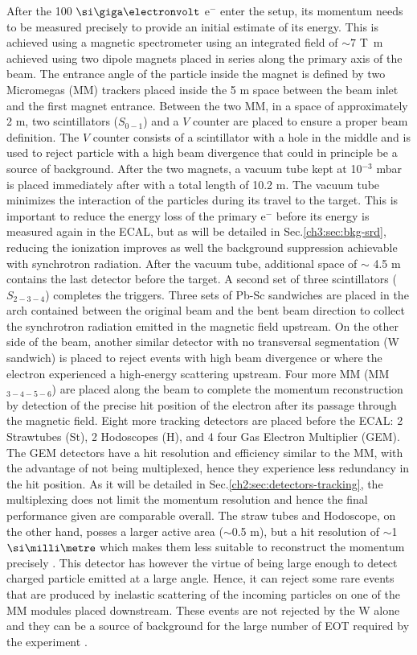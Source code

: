 After the 100 $\gev$ e$^-$ enter the setup, its momentum needs to be measured precisely to provide an initial estimate of its energy. This is achieved using a magnetic spectrometer using an integrated field of $\sim 7$ \si{\tesla\meter} achieved using two dipole magnets \cite{mbpl} placed in series along the primary axis of the beam. The entrance angle of the particle inside the magnet is defined by two Micromegas (MM) trackers placed inside the 5 m space between the beam inlet and the first magnet entrance. Between the two MM, in a space of approximately 2 m, two scintillators ($S_{0-1}$) and a $V$ counter are placed to ensure a proper beam definition. The $V$ counter consists of a scintillator with a hole in the middle and is used to reject particle with a high beam divergence that could in principle be a source of background. After the two magnets, a vacuum tube kept at 10$^{-3}$ \si{mbar} is placed immediately after with a total length of 10.2 \si{m}. The vacuum tube minimizes the interaction of the particles during its travel to the target. This is important to reduce the energy loss of the primary e$^-$ before its energy is measured again in the ECAL, but as will be detailed in Sec.\ref{ch3:sec:bkg-srd}, reducing the ionization improves as well the background suppression achievable with synchrotron radiation. After the vacuum tube, additional space of $\sim$ 4.5 \si{m} contains the last detector before the target. A second set of three scintillators ($S_{2-3-4}$) completes the triggers. Three sets of Pb-Sc sandwiches are placed in the arch contained between the original beam and the bent beam direction to collect the synchrotron radiation emitted in the magnetic field upstream. On the other side of the beam, another similar detector with no transversal segmentation (W sandwich) is placed to reject events with high beam divergence or where the electron experienced a high-energy scattering upstream. Four more MM (MM$_{3-4-5-6}$) are placed along the beam to complete the momentum reconstruction by detection of the precise hit position of the electron after its passage through the magnetic field. Eight more tracking detectors are placed before the ECAL: 2 Strawtubes (St), 2 Hodoscopes (H), and 4 four Gas Electron Multiplier (GEM). The GEM detectors have a hit resolution and efficiency similar to the MM, with the advantage of not being multiplexed, hence they experience less redundancy in the hit position. As it will be detailed in Sec.\ref{ch2:sec:detectors-tracking}, the multiplexing does not limit the momentum resolution and hence the final performance given are comparable overall. The straw tubes and Hodoscope, on the other hand, posses a larger active area ($\sim$0.5 m), but a hit resolution of $\sim$1 $\mmi$ which makes them less suitable to reconstruct the momentum precisely \cite{Volkov:2019qhb}. This detector has however the virtue of being large enough to detect charged particle emitted at a large angle. Hence, it can reject some rare events that are produced by inelastic scattering of the incoming particles on one of the MM modules placed downstream. These events are not rejected by the W alone and they can be a source of background for the large number of EOT required by the experiment \cite{na64-prd}. 

